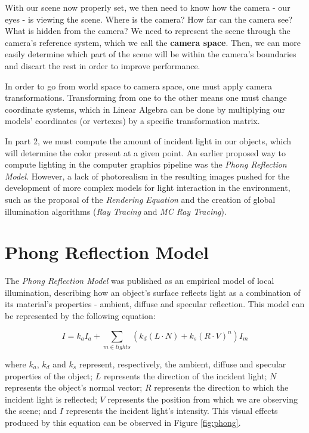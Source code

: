 With our scene now properly set, we then need to know how the camera - our eyes - is viewing the scene. Where is the camera? How far can the camera see? What is hidden from the camera? We need to represent the scene through the camera's reference system, which we call the \textbf{camera space}. Then, we can more easily determine which part of the scene will be within the camera's boundaries and discart the rest in order to improve performance.

In order to go from world space to camera space, one must apply camera transformations. Transforming from one to the other means one must change coordinate systems, which in Linear Algebra can be done by multiplying our models' coordinates (or vertexes) by a specific transformation matrix. 

In part 2, we must compute the amount of incident light in our objects, which will determine the color present at a given point. An earlier proposed way to compute lighting in the computer graphics pipeline was the \textit{Phong Reflection Model}. However, a lack of photorealism in the resulting images pushed for the development of more complex models for light interaction in the environment, such as the proposal of the \textit{Rendering Equation} and the creation of global illumination algorithms (\ie \textit{Ray Tracing} and \textit{MC Ray Tracing}).

\section{Phong Reflection Model}

The \textit{Phong Reflection Model} \cite{Phong:1975} was published as an empirical model of local illumination, describing how an object's surface reflects light as a combination of its material's properties - ambient, diffuse and specular reflection. This model can be represented by the following equation:

\begin{equation}
  I = k_a I_a + \sum_{m \in lights} (k_d (L \cdot N) + k_s (R \cdot V)^n) I_m
\end{equation}

where $k_a$, $k_d$ and $k_s$ represent, respectively, the ambient, diffuse and specular properties of the object; $L$ represents the direction of the incident light; $N$ represents the object's normal vector; $R$ represents the direction to which the incident light is reflected; $V$ represents the position from which we are observing the scene; and $I$ represents the incident light's intensity. This visual effects produced by this equation can be observed in Figure \ref{fig:phong}.

